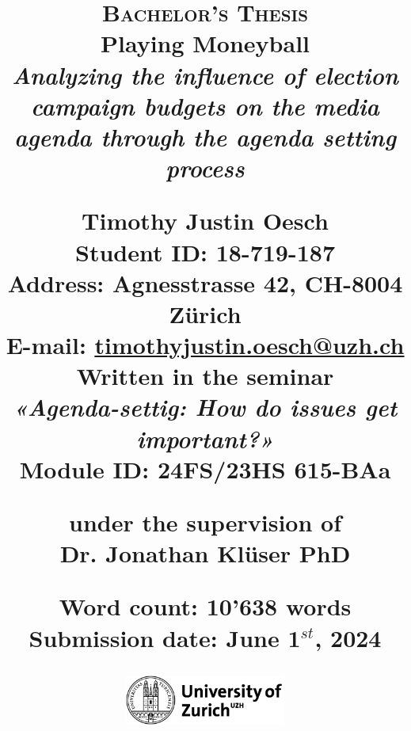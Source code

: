 \begin{titlepage}
\title{
    \raggedright
    \small
    \textsc{Bachelor's Thesis} \\
    \vspace{0.5cm}
    \fontsize{32pt}{32pt}
    \textbf{Playing Moneyball}\\
    \vspace{0.2cm}
    \Large\textit{Analyzing the influence of election campaign budgets on the media agenda through the agenda setting process} \\
    
    \vspace{1cm}

    \textbf{Timothy Justin Oesch }\\
    \vspace{0.25cm}
    \normalsize
    \textbf{Student ID:} 18-719-187\\
    \textbf{Address:} Agnesstrasse 42, CH-8004 Zürich\\
    \textbf{E-mail:} \href{mailto:timothyjustin.oesch@uzh.ch}{\underline{timothyjustin.oesch@uzh.ch}}\\
    
    \vspace{0.5cm} 
    Written in the seminar\\
    \textit{«Agenda-settig: How do issues get important?»}\\
    Module ID: 24FS/23HS 615-BAa
    
    \vspace{0.5cm}
    under the supervision of\\
    \textbf{Dr. Jonathan Klüser PhD}

    
    
    \vspace{0.25cm}
    \scriptsize{
        Word count: 10'638 words \\
        Submission date: June 1$^{st}$, 2024
    } \\
    
    \date{}
    \begin{figure}[b]
        \centering
        \includegraphics[width=200px]{LaTeX/partials/01.1_uzh_logo.png}
    \end{figure}
}
\clearpage\maketitle
\thispagestyle{empty}
\end{titlepage}